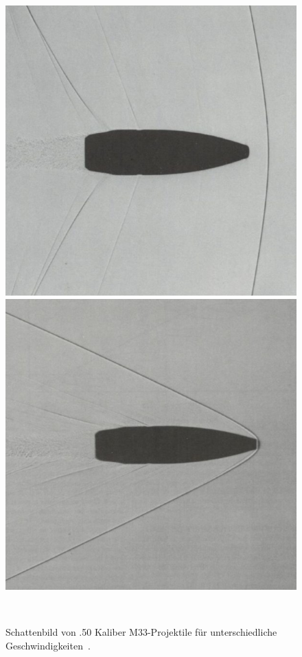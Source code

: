\begin{figure}
\begin{minipage}[b]{0.32\textwidth}
        \includegraphics[width=\linewidth]{papers/ueberschall/figures/1.06_mach_projektil.jpg}
        \caption*{$1.06\,\mathrm{Mach}$}
    \end{minipage}
    \hfill
    \begin{minipage}[b]{0.32\textwidth}
        \centering
        \includegraphics[width=\linewidth]{papers/ueberschall/figures/2.66_mach_projektil.jpg}
        \caption*{$2.66\,\mathrm{Mach}$}
    \end{minipage}
    \caption{Schattenbild von .50 Kaliber M33-Projektile für unterschiedliche Geschwindigkeiten~\cite{Mittelkaliber2020}.}
~\label{fig:machsche_kegel_projektil}
\end{figure}
